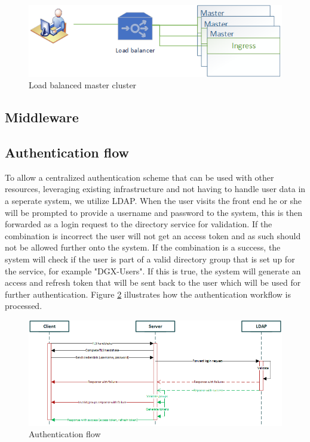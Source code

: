 \documentclass[../main.tex]{subfiles}
\begin{document}
\begin{figure}[H]
    \centering
    \includegraphics{img/architecture_overview_lb.png}
    \caption{Load balanced master cluster}
    \label{fig:architecture_overview_lb}
\end{figure}



\subsection{Middleware}\label{sec:tech_design_middleware}
\subsection*{Authentication flow}
To allow a centralized authentication scheme that can be used with other resources, leveraging existing infrastructure and not having to handle user data in a seperate system, we utilize LDAP. When the user visits the front end he or she will be prompted to provide a username and password to the system, this is then forwarded as a login request to the directory service for validation. If the combination is incorrect the user will not get an access token and as such should not be allowed further onto the system. If the combination is a success, the system will check if the user is part of a valid directory group that is set up for the service, for example "DGX-Users". If this is true, the system will generate an access and refresh token that will be sent back to the user which will be used for further authentication. Figure \ref{fig:authentication_flow} illustrates how the authentication workflow is processed.
\begin{figure}[H]
    \centering
    \includegraphics[scale=.75]{img/authentication_flow.png}
    \caption{Authentication flow}
    \label{fig:authentication_flow}
\end{figure}
\end{document}
